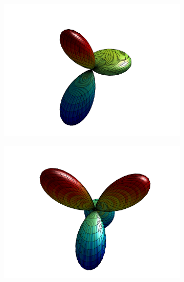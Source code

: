 \begin{figure}
\begin{subfigure}[b]{0.40\textwidth}
		\includegraphics[width=\textwidth]{figures/appendices/Y_3_1.png}
		\caption{}
	\end{subfigure}
	\vfill
	\begin{subfigure}[b]{0.40\textwidth}
		\centering
		\includegraphics[width=\textwidth]{figures/appendices/Y_3_-2.png}
		\caption{}
	\end{subfigure}
	\hfill
	\begin{subfigure}[b]{0.40\textwidth}
		\centering

\end{subfigure}
\end{figure}
